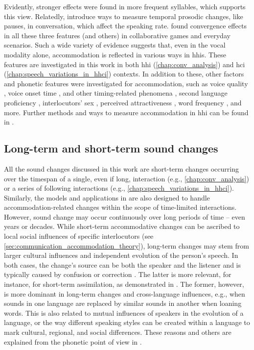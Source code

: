 Evidently, stronger effects were found in more frequent syllables, which supports this view.
Relatedly, \citet{Edlund2009pause, Xiao2015analyzing, Cohen2017converging} introduce ways to measure temporal prosodic changes, like pauses, in conversation, which affect the speaking rate.
\citet{Levitan2011measuring, Local2007phonetic} found convergence effects in all these three features (and others) in collaborative games and everyday scenarios.
Such a wide variety of evidence suggests that, even in the vocal modality alone, accommodation is reflected in various ways in \acp{hhi}.
These features are investigated in this work in both \ac{hhi} (\cref{chap:conv_analysis}) and \ac{hci} (\cref{chap:speech_variations_in_hhci}) contexts.
In addition to these, other factors and phonetic features were investigated for accommodation, such as voice quality \citep{Borrie2017conversational}, voice onset time \citep{Nielsen2011specificity}, and other timing-related phenomena \citep{Putman1984conception}, second language proficiency \citep{Law2020convergence}, interlocutors' sex \citep{Levitan2012acoustic, Bailly2014assessing}, perceived attractiveness \citep{Michalsky2017pitch}, word frequency \citep{Nenkova2008high}, and more.
Further methods and ways to measure accommodation in \ac{hhi} can be found in \citet{Lewandowski2019phonetic, DeLooze2014investigating}.

\subsection{Long-term and short-term sound changes}
\label{subsec:sound_change}

All the sound changes discussed in this work are short-term changes occurring over the timespan of a single, even if long, interaction (e.g., \cref{chap:conv_analysis}) or a series of following interactions (e.g., \cref{chap:speech_variations_in_hhci}).
Similarly, the models and applications in  are also designed to handle accommodation-related changes within the scope of time-limited interactions.
However, sound change may occur continuously over long periods of time -- even years or decades.
While short-term accommodative changes can be ascribed to local social influences of specific interlocutors (see \cref{sec:communication_accommodation_theory}), long-term changes may stem from larger cultural influences and independent evolution of the person's speech.
In both cases, the change's source can be both the speaker and the listener \citep[][pp.~176-187]{Ohala1989sound} and is typically caused by confusion or correction \citep{Ohala1993phonetics}.
The latter is more relevant, for instance, for short-term assimilation, as demonstrated in \citet{Ohala1990phonetics}.
The former, however, is more dominant in long-term changes and cross-language influences, e.g., when sounds in one language are replaced by similar sounds in another when loaning words.
This is also related to mutual influences of speakers in the evolution of a language, or the way different speaking styles can be created within a language to mark cultural, regional, and social differences.
These reasons and others are explained from the phonetic point of view in \citet{Sweet1874history}.

